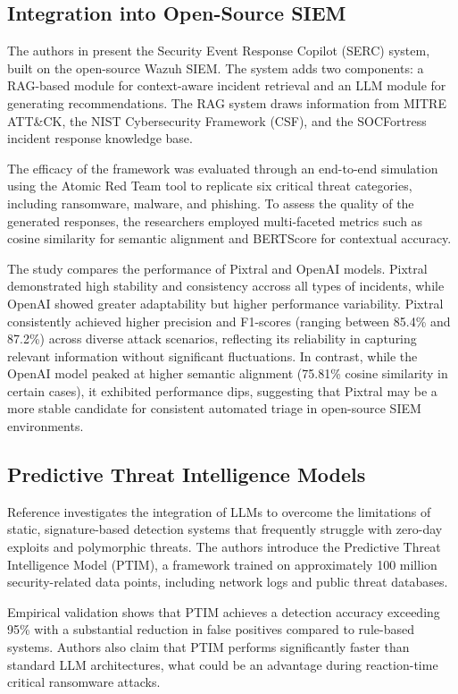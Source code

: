 \documentclass[conference]{IEEEtran}
\begin{document}
\subsection{Integration into Open-Source SIEM}
The authors in \cite{b3} present the Security Event Response Copilot (SERC) system, built on the open-source Wazuh SIEM.
The system adds two components: a RAG-based module for context-aware incident retrieval and an LLM module for generating recommendations. 
The RAG system draws information from MITRE ATT\&CK, the NIST Cybersecurity Framework (CSF), and the SOCFortress incident response knowledge base.

The efficacy of the framework was evaluated through an end-to-end simulation using the Atomic Red Team tool to replicate six 
critical threat categories, including ransomware, malware, and phishing. 
To assess the quality of the generated responses, the researchers employed multi-faceted metrics such as cosine similarity 
for semantic alignment and BERTScore for contextual accuracy.

The study compares the performance of Pixtral and OpenAI models. Pixtral demonstrated high stability and consistency accross all types of incidents,
while OpenAI showed greater adaptability but higher performance variability. 
Pixtral consistently achieved higher precision and F1-scores (ranging between 85.4\% and 87.2\%) across diverse attack scenarios, reflecting its reliability in capturing relevant information without significant fluctuations. 
In contrast, while the OpenAI model peaked at higher semantic alignment (75.81\% cosine similarity in certain cases), 
it exhibited performance dips, suggesting that Pixtral may be a more stable candidate for consistent automated triage in open-source SIEM environments.

\subsection{Predictive Threat Intelligence Models}
Reference \cite{b8} investigates the integration of LLMs to overcome the limitations of static, signature-based detection systems that frequently struggle with zero-day exploits and polymorphic threats. 
The authors introduce the Predictive Threat Intelligence Model (PTIM), a framework trained on approximately 100 million security-related data points, 
including network logs and public threat databases. 

Empirical validation shows that PTIM achieves a detection accuracy exceeding 95\% with a substantial reduction in false positives compared to rule-based systems. 
Authors also claim that PTIM performs significantly faster than standard LLM architectures, what could be an advantage during reaction-time critical ransomware attacks. 
\end{document}
